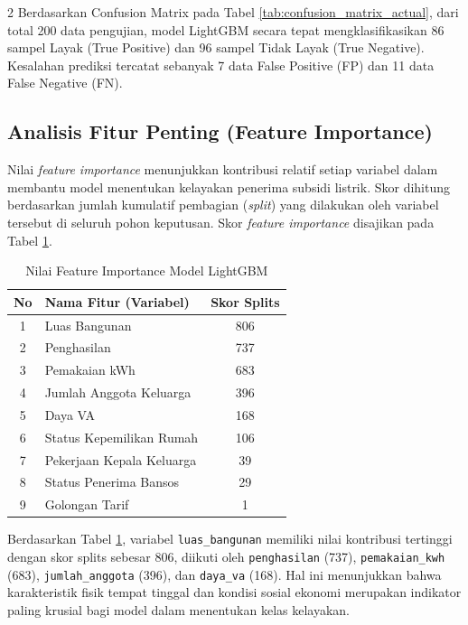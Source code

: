 \documentclass[12pt, a4paper, onecolumn, oneside]{report}
\begin{document}
\begin{spacing}{2}
Berdasarkan Confusion Matrix pada Tabel \ref{tab:confusion_matrix_actual}, dari total 200 data pengujian, model LightGBM secara tepat mengklasifikasikan 86 sampel Layak (True Positive) dan 96 sampel Tidak Layak (True Negative). Kesalahan prediksi tercatat sebanyak 7 data False Positive (FP) dan 11 data False Negative (FN).

\subsection{Analisis Fitur Penting (Feature Importance)}
Nilai \textit{feature importance} menunjukkan kontribusi relatif setiap variabel dalam membantu model menentukan kelayakan penerima subsidi listrik. Skor dihitung berdasarkan jumlah kumulatif pembagian (\textit{split}) yang dilakukan oleh variabel tersebut di seluruh pohon keputusan. Skor \textit{feature importance} disajikan pada Tabel \ref{tab:feature_importance_actual}.

\begin{table}[H]
\centering
\caption{Nilai Feature Importance Model LightGBM}
\label{tab:feature_importance_actual}
\begin{tabular}{|c|l|c|}
\hline
\textbf{No} & \textbf{Nama Fitur (Variabel)} & \textbf{Skor Splits} \\ \hline
1 & Luas Bangunan & 806 \\ \hline
2 & Penghasilan & 737 \\ \hline
3 & Pemakaian kWh & 683 \\ \hline
4 & Jumlah Anggota Keluarga & 396 \\ \hline
5 & Daya VA & 168 \\ \hline
6 & Status Kepemilikan Rumah & 106 \\ \hline
7 & Pekerjaan Kepala Keluarga & 39 \\ \hline
8 & Status Penerima Bansos & 29 \\ \hline
9 & Golongan Tarif & 1 \\ \hline
\end{tabular}
\end{table}

Berdasarkan Tabel \ref{tab:feature_importance_actual}, variabel \texttt{luas\_bangunan} memiliki nilai kontribusi tertinggi dengan skor splits sebesar 806, diikuti oleh \texttt{penghasilan} (737), \texttt{pemakaian\_kwh} (683), \texttt{jumlah\_anggota} (396), dan \texttt{daya\_va} (168). Hal ini menunjukkan bahwa karakteristik fisik tempat tinggal dan kondisi sosial ekonomi merupakan indikator paling krusial bagi model dalam menentukan kelas kelayakan.


\end{spacing}
\end{document}
